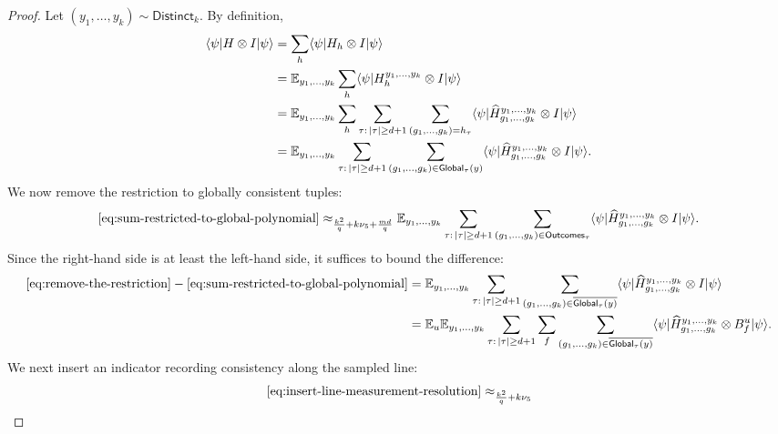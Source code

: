 \begin{proof}
	\leanok
	Let $(y_1,\dots,y_k)\sim \mathsf{Distinct}_k$. By definition,
	\begin{align}
		\langle \psi \rvert H \otimes I \lvert \psi \rangle
		 & =
		\sum_h \langle \psi \rvert H_h \otimes I \lvert \psi \rangle\nonumber                                    \\
		 & =
		\mathbb{E}_{y_1,\dots,y_k} \sum_h \langle \psi \rvert H_h^{y_1,\dots,y_k} \otimes I \lvert \psi \rangle\nonumber \\
		 & =
		\mathbb{E}_{y_1,\dots,y_k} \sum_h \sum_{\tau:\,|\tau|\ge d+1}
		\sum_{(g_1,\dots,g_k)=h_\tau}
		\langle \psi \rvert \widehat H_{g_1,\dots,g_k}^{y_1,\dots,y_k} \otimes I \lvert \psi \rangle\nonumber    \\
		 & =
		\mathbb{E}_{y_1,\dots,y_k} \sum_{\tau:\,|\tau|\ge d+1}
		\sum_{(g_1,\dots,g_k)\in \mathsf{Global}_\tau(y)}
		\langle \psi \rvert \widehat H_{g_1,\dots,g_k}^{y_1,\dots,y_k} \otimes I \lvert \psi \rangle.
		\label{eq:sum-restricted-to-global-polynomial}
	\end{align}
	We now remove the restriction to globally consistent tuples:
	\begin{equation}\label{eq:remove-the-restriction}
		\eqref{eq:sum-restricted-to-global-polynomial}
		\approx_{\frac{k^2}{q}+k\nu_5+\frac{md}{q}}
		\mathbb{E}_{y_1,\dots,y_k} \sum_{\tau:\,|\tau|\ge d+1}
		\sum_{(g_1,\dots,g_k)\in \mathsf{Outcomes}_\tau}
		\langle \psi \rvert \widehat H_{g_1,\dots,g_k}^{y_1,\dots,y_k} \otimes I \lvert \psi \rangle.
	\end{equation}
	Since the right-hand side is at least the left-hand side, it suffices to bound the difference:
	\begin{align}
		\eqref{eq:remove-the-restriction} - \eqref{eq:sum-restricted-to-global-polynomial}
		 & =
		\mathbb{E}_{y_1,\dots,y_k} \sum_{\tau:\,|\tau|\ge d+1}
		\sum_{(g_1,\dots,g_k)\in \overline{\mathsf{Global}_\tau(y)}}
		\langle \psi \rvert \widehat H_{g_1,\dots,g_k}^{y_1,\dots,y_k} \otimes I \lvert \psi \rangle\nonumber \\
		 & =
		\mathbb{E}_u \mathbb{E}_{y_1,\dots,y_k} \sum_{\tau:\,|\tau|\ge d+1} \sum_f
		\sum_{(g_1,\dots,g_k)\in \overline{\mathsf{Global}_\tau(y)}}
		\langle \psi \rvert \widehat H_{g_1,\dots,g_k}^{y_1,\dots,y_k} \otimes B_f^u \lvert \psi \rangle.
		\label{eq:insert-line-measurement-resolution}
	\end{align}
	We next insert an indicator recording consistency along the sampled line:
	\begin{equation}\label{eq:insert-line-consistency-indicator}
		\eqref{eq:insert-line-measurement-resolution}
		\approx_{\frac{k^2}{q}+k\nu_5}

\end{equation}
\end{proof}
